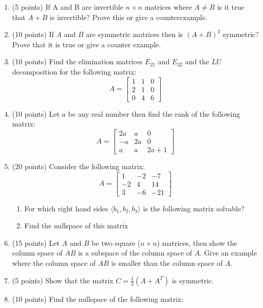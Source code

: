 \documentclass[10pt, a4paper]{article}
\theoremstyle{break}
\begin{document}
\begin{enumerate}
\item (5 points) If A and B are invertible $n\times n$ matrices where $A\neq B$ is it true that $A+B$ is invertible? Prove this or give a counterexample.
\item (10 points) If $A$ and $B$ are symmetric matrices then is $(A+B)^2$ symmetric? Prove that it is true or give a counter example.
\item (10 points) Find the elimination matrices $E_{21}$ and $E_{32}$ and the $LU$ decomposition for the following matrix:
\begin{equation}
A=
\begin{bmatrix}
 1 & 1 & 0 \\
 2 & 1 & 0 \\
 0 & 4 &6
\end{bmatrix}
\end{equation}
\item (10 points) Let $a$ be any real number then find the rank of the following matrix:
\begin{equation}
A=
\begin{bmatrix}
 2a & a & 0 \\
 -a & 2a & 0 \\
 a & a &2a+1
\end{bmatrix}
\end{equation}
\item (20 points) Consider the following matrix:
\begin{equation}
A=
\begin{bmatrix}
 1 & -2 & -7 \\
 -2 & 4 & 14 \\
 3 & -6 &-21
\end{bmatrix}
\end{equation}
\begin{enumerate}
\item  For which right hand sides $\langle b_1,b_2,b_3\rangle$ is the following matrix solvable?
\item Find the nullspace of this matrix
\end{enumerate}
\item (15 points) Let $A$ and $B$ be two square ($n \times n$) matrices, then show the column space of $AB$ is a subspace of the column space of $A$. Give an example where the column space of $AB$ is smaller than the column space of $A$. 
\item (5 points) Show that the matrix $C=\frac{1}{2}(A+A^T)$ is symmetric.
\item (10 points) Find the nullspace of the following matrix:

\end{enumerate}
\end{document}
